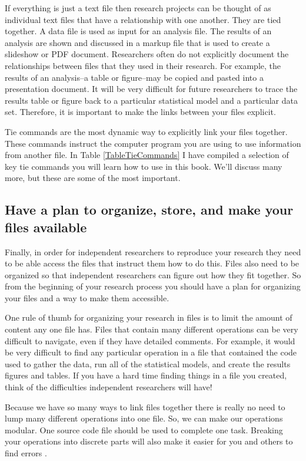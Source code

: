 {If everything is just a text file then research projects can be thought of as individual text files that have a relationship with one another. They are tied together. A data file is used as input for an analysis file. The results of an analysis are shown and discussed in a markup file that is used to create a slideshow or PDF document. Researchers often do not explicitly document the relationships between files that they used in their research. For example, the results of an analysis--a table or figure--may be copied and pasted into a presentation document. It will be very difficult for future researchers to trace the results table or figure back to a particular statistical model and a particular data set. Therefore, it is important to make the links between your files explicit. 

Tie commands are the most dynamic way to explicitly link your files together. These commands instruct the computer program you are using to use information from another file. In Table \ref{TableTieCommands} I have compiled a selection of key tie commands you will learn how to use in this book. We'll discuss many more, but these are some of the most important.

\subsection{Have a plan to organize, store, and make your files available}

Finally, in order for independent researchers to reproduce your research they need to be able access the files that instruct them how to do this. Files also need to be organized so that independent researchers can figure out how they fit together. So from the beginning of your research process you should have a plan for organizing your files and a way to make them accessible. 

One rule of thumb for organizing your research in files is to limit the amount of content any one file has. Files that contain many different operations can be very difficult to navigate, even if they have detailed comments. For example, it would be very difficult to find any particular operation in a file that contained the code used to gather the data, run all of the statistical models, and create the results figures and tables. If you have a hard time finding things in a file you created, think of the difficulties independent researchers will have! 

Because we have so many ways to link files together there is really no need to lump many different operations into one file. So, we can make our operations modular. One source code file should be used to complete one task. Breaking your operations into discrete parts will also make it easier for you and others to find errors \cite[490]{Nagler1995}.

}
